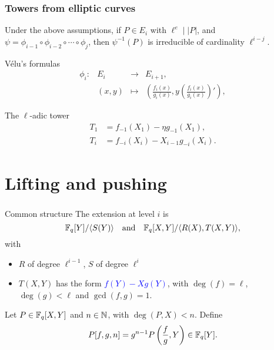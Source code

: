 \documentclass[12pt]{beamer}
\begin{document}

\begin{frame}
	\frametitle{Towers from elliptic curves}
	
	Under the above assumptions, if $P \in E_i$ with $\ell^e \mid \lvert P \rvert$, and $\psi=\phi_{i-1}\circ\phi_{i-2}\circ\cdots\circ\phi_{j}$, then $\psi^{-1}(P)$ is irreducible of cardinality $\ell^{i-j}$.
	\vspace*{5mm}
	\begin{exampleblock}{V\'elu's formulas}
		\begin{equation*}
		  \begin{array}{crcl}
		    \phi_i: & E_i &\longrightarrow & E_{i+1},\\
		    & (x,y) &\longmapsto & \left(\frac{f_i(x)}{g_i(x)}, y\left(\frac{f_i(x)}{g_i(x)}\right)'\right),
		  \end{array}
		\end{equation*}
	\end{exampleblock}
	
	\begin{block}{The $\ell$-adic tower}
		\begin{align*}
		  T_1 &= f_{-1}(X_1) - \eta g_{-1}(X_1),\\ 
		  T_i &= f_{-i}(X_i) - X_{i-1} g_{-i}(X_i).
		\end{align*}
	\end{block}
\end{frame}


\section{Lifting and pushing}

\begin{frame}
	\frametitle{\insertsection}
	
	\begin{block}{Common structure}
		The	extension at level $i$ is
		$$\mathbb{F}_q[Y]/ \langle S(Y) \rangle \quad\text{and}\quad \mathbb{F}_q[X,Y]/\langle R(X), T(X,Y) \rangle,$$
		with 
		\begin{itemize}
			\item $R$ of degree $\ell^{i-1}$, $S$ of degree	$\ell^i$
			\item $T(X,Y)$ has the form \textcolor{blue}{$f(Y)-X g(Y)$}, with $\deg(f)=\ell$, $\deg(g) < \ell$ and $\gcd(f,g)=1$.
		\end{itemize}
	\end{block}
	
	\begin{definition}
		Let $P \in \mathbb{F}_q[X,Y]$ and $n \in \mathbb{N}$, with $\deg(P,X)< n$. Define
		$$P[f,g,n] = g^{n-1} P\left (\frac fg, Y\right) \in \mathbb{F}_q[Y].$$
	\end{definition}
\end{frame}
\end{document}
